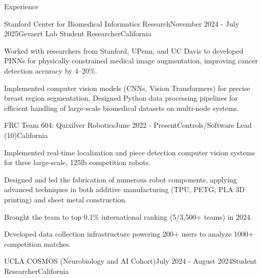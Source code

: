 \documentclass[
  10pt, %
]{resume}
\begin{document}
\sloppy


\begin{rSection}{Experience}


  \begin{rSubsection}{Stanford Center for Biomedical Informatics Research}{November 2024 - July 2025}{Gevaert Lab Student Researcher}{California}
    
    \item Worked with researchers from Stanford, UPenn, and UC Davis to developed PINNs for physically constrained medical image augmentation, improving cancer detection accuracy by 4–20\%.
    
    \item Implemented computer vision models (CNNs, Vision Transformers) for precise breast region segmentation, Designed Python data processing pipelines for efficient handling of large-scale biomedical datasets on multi-node systems.
    
  \end{rSubsection}
        
  \begin{rSubsection}{FRC Team 604: Quixilver Robotics}{June 2022 - Present}{Controls/Software Lead (10)}{California}
    
    \item Implemented real-time localization and piece detection computer vision systems for three large-scale, 125lb competition robots.
    
    \item Designed and led the fabrication of numerous robot components, applying advanced techniques in both additive manufacturing (TPU, PETG, PLA 3D printing) and sheet metal construction.
    
    \item Brought the team to top 0.1\% international ranking (5/3,500+ teams) in 2024.
    
    \item Developed data collection infrastructure powering 200+ users to analyze 1000+ competition matches.
    
  \end{rSubsection}
        
  \begin{rSubsection}{UCLA COSMOS (Neurobiology and AI Cohort)}{July 2024 - August 2024}{Student Researcher}{California}
    

\end{rSubsection}
\end{rSection}
\end{document}
